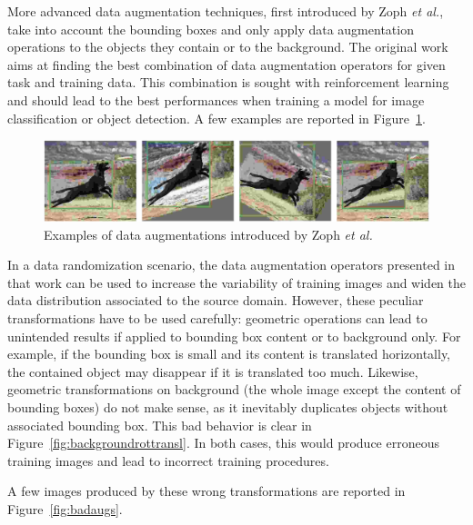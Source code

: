 \documentclass[%
    corpo=12pt,
    twoside,
    stile=classica,   
    tipotesi=magistrale,
    evenboxes,
    english,
	numerazioneromana,
]{toptesi}
\begin{document}
\bigskip
More advanced data augmentation techniques, first introduced by Zoph \textit{et al.}\cite{zoph2019learning}, take into account the bounding boxes and only apply data augmentation operations to the objects they contain or to the background. The original work aims at finding the best combination of data augmentation operators for given task and training data. This combination is sought with reinforcement learning and should lead to the best performances when training a model for image classification or object detection. A few examples are reported in Figure~\ref{fig:learndataaug}.

\begin{figure}[ht!]
	\centering
	\includegraphics[width=0.9\linewidth]{imgs/learndataaug.png}
	\caption{Examples of data augmentations introduced by Zoph \textit{et al.}\cite{zoph2019learning}}
	\label{fig:learndataaug}
\end{figure}

\medskip
In a data randomization scenario, the data augmentation operators presented in that work can be used to increase the variability of training images and widen the data distribution associated to the source domain. However, these peculiar transformations have to be used carefully: geometric operations can lead to unintended results if applied to bounding box content or to background only. For example, if the bounding box is small and its content is translated horizontally, the contained object may disappear if it is translated too much. Likewise, geometric transformations on background (the whole image except the content of bounding boxes) do not make sense, as it inevitably duplicates objects without associated bounding box. This bad behavior is clear in Figure~\ref{fig:backgroundrottransl}. In both cases, this would produce erroneous training images and lead to incorrect training procedures.

A few images produced by these wrong transformations are reported in Figure~\ref{fig:badaugs}.
\end{document}
